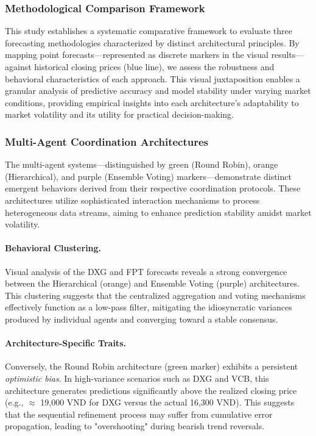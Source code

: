 \documentclass{ieeeaccess}
\begin{document}
\subsubsection{Methodological Comparison Framework}
This study establishes a systematic comparative framework to evaluate three forecasting methodologies characterized by distinct architectural principles. By mapping point forecasts—represented as discrete markers in the visual results—against historical closing prices (blue line), we assess the robustness and behavioral characteristics of each approach. This visual juxtaposition enables a granular analysis of predictive accuracy and model stability under varying market conditions, providing empirical insights into each architecture's adaptability to market volatility and its utility for practical decision-making.

\subsubsection{Multi-Agent Coordination Architectures}
The multi-agent systems—distinguished by green (Round Robin), orange (Hierarchical), and purple (Ensemble Voting) markers—demonstrate distinct emergent behaviors derived from their respective coordination protocols. These architectures utilize sophisticated interaction mechanisms to process heterogeneous data streams, aiming to enhance prediction stability amidst market volatility.

\paragraph{Behavioral Clustering.}
Visual analysis of the DXG and FPT forecasts reveals a strong convergence between the Hierarchical (orange) and Ensemble Voting (purple) architectures. This clustering suggests that the centralized aggregation and voting mechanisms effectively function as a low-pass filter, mitigating the idiosyncratic variances produced by individual agents and converging toward a stable consensus.

\paragraph{Architecture-Specific Traits.}
Conversely, the Round Robin architecture (green marker) exhibits a persistent \textit{optimistic bias}. In high-variance scenarios such as DXG and VCB, this architecture generates predictions significantly above the realized closing price (e.g., $\approx$ 19,000 VND for DXG versus the actual 16,300 VND). This suggests that the sequential refinement process may suffer from cumulative error propagation, leading to "overshooting" during bearish trend reversals.
\end{document}
